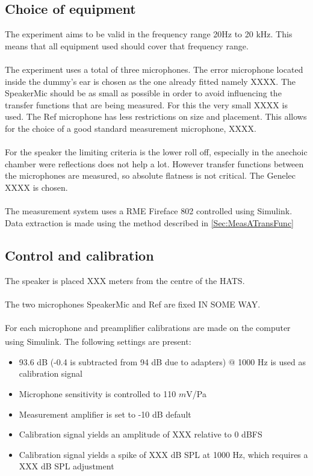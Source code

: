 \subsection{Choice of equipment}
The experiment aims to be valid in the frequency range 20Hz to 20 kHz. This means that all equipment used should cover that frequency range. \\\\
The experiment uses a total of three microphones. The error microphone located inside the dummy's ear is chosen as the one already fitted namely XXXX. The SpeakerMic should be as small as possible in order to avoid influencing the transfer functions that are being measured. For this the very small XXXX is used. The Ref microphone has less restrictions on size and placement. This allows for the choice of a good standard measurement microphone, XXXX. \\\\
For the speaker the limiting criteria is the lower roll off, especially in the anechoic chamber were reflections does not help a lot. However transfer functions between the microphones are measured, so absolute flatness is not critical. The Genelec XXXX is chosen. \\\\
The measurement system uses a RME Fireface 802 controlled using Simulink. Data extraction is made using the method described in \autoref{Sec:MeasATransFunc}

\subsection{Control and calibration}
The speaker is placed XXX meters from the centre of the HATS. \\\\
The two microphones SpeakerMic and Ref are fixed IN SOME WAY. \\\\
For each microphone and preamplifier calibrations are made on the computer using Simulink\textsuperscript{\textregistered}. The following settings are present:
\begin{itemize}
	\item 93.6 dB (-0.4 is subtracted from 94 dB due to adapters) $@$ 1000 Hz is used as calibration signal
	\item Microphone sensitivity is controlled to 110 $m$V/Pa
	\item Measurement amplifier is set to -10 dB default
	\item Calibration signal yields an amplitude of XXX relative to 0 dBFS
	\item  Calibration signal yields a spike of XXX dB SPL at 1000 Hz, which requires a XXX dB SPL adjustment
\end{itemize}

